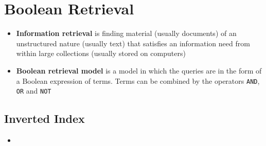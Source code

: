 \section{Boolean Retrieval}
\begin{itemize}
	\item \textbf{Information retrieval} is finding material (usually documents) of an unstructured nature (usually text) that satisfies an information need from within large collections (usually stored on computers)
	\item \textbf{Boolean retrieval model} is a model in which the queries are in the form of a Boolean expression of terms. Terms can be combined by the operators \texttt{AND}, \texttt{OR} and \texttt{NOT} 
\end{itemize}
\subsection{Inverted Index}
\begin{itemize}
	\item 
\end{itemize}